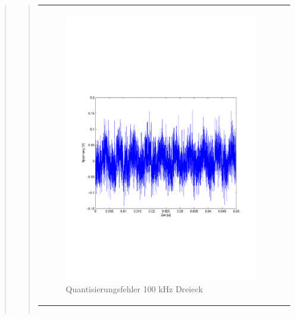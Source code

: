 \begin{quote}
\begin{quote}
\begin{center}
\begin{tabular}{ll}
                \begin{minipage}{0.6\textwidth}
                    \begin{figure}[H]
                        \includegraphics[scale=0.5, trim = 16mm 70mm 16mm 85mm, clip]
                                        {Bilder/100kHz_dreieck_Quantisierungsfehler}
                        \caption{Quantisierungsfehler 100 kHz Dreieck}
                        \label{fig:QuantErr 100 kHz Dreieck}
                    \end{figure}
                \end{minipage}
            
            \end{tabular}
        \end{center}
        
        
        
        \begin{center}
            \begin{tabular}{ll}
            

\end{tabular}
\end{center}
\end{quote}
\end{quote}
